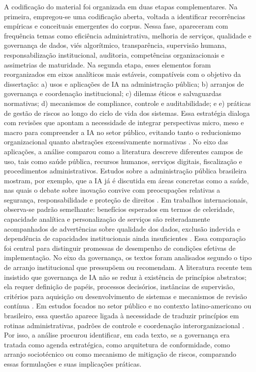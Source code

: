 \documentclass[12pt,a4paper]{article}
\begin{document}
A codificação do material foi organizada em duas etapas complementares. Na primeira, empregou-se uma codificação aberta, voltada a identificar recorrências empíricas e conceituais emergentes do corpus. Nessa fase, apareceram com frequência temas como eficiência administrativa, melhoria de serviços, qualidade e governança de dados, viés algorítmico, transparência, supervisão humana, responsabilização institucional, auditoria, competências organizacionais e assimetrias de maturidade. Na segunda etapa, esses elementos foram reorganizados em eixos analíticos mais estáveis, compatíveis com o objetivo da dissertação: a) usos e aplicações de IA na administração pública; b) arranjos de governança e coordenação institucional; c) dilemas éticos e salvaguardas normativas; d) mecanismos de compliance, controle e auditabilidade; e e) práticas de gestão de riscos ao longo do ciclo de vida dos sistemas. Essa estratégia dialoga com revisões que apontam a necessidade de integrar perspectivas micro, meso e macro para compreender a IA no setor público, evitando tanto o reducionismo organizacional quanto abstrações excessivamente normativas \autocite{criado2024artificial}.
No eixo das aplicações, a análise comparou como a literatura descreve diferentes campos de uso, tais como saúde pública, recursos humanos, serviços digitais, fiscalização e procedimentos administrativos. Estudos sobre a administração pública brasileira mostram, por exemplo, que a IA já é discutida em áreas concretas como a saúde, nas quais o debate sobre inovação convive com preocupações relativas a segurança, responsabilidade e proteção de direitos \autocite{lemes2020o}. Em trabalhos internacionais, observa-se padrão semelhante: benefícios esperados em termos de celeridade, capacidade analítica e personalização de serviços são reiteradamente acompanhados de advertências sobre qualidade dos dados, exclusão indevida e dependência de capacidades institucionais ainda insuficientes \autocite{alhosani2024opportunities} \autocite{yiitcanlar2022artificial}. Essa comparação foi central para distinguir promessas de desempenho de condições efetivas de implementação.
No eixo da governança, os textos foram analisados segundo o tipo de arranjo institucional que pressupõem ou recomendam. A literatura recente tem insistido que governança de IA não se reduz à existência de princípios abstratos; ela requer definição de papéis, processos decisórios, instâncias de supervisão, critérios para aquisição ou desenvolvimento de sistemas e mecanismos de revisão contínua \autocite{batool2025ai} \autocite{sigfrids2022how}. Em estudos focados no setor público e no contexto latino-americano ou brasileiro, essa questão aparece ligada à necessidade de traduzir princípios em rotinas administrativas, padrões de controle e coordenação interorganizacional \autocite{criado2024inteligencia} \autocite{goulart2025processos} \autocite{serra2024a}. Por isso, a análise procurou identificar, em cada texto, se a governança era tratada como agenda estratégica, como arquitetura de conformidade, como arranjo sociotécnico ou como mecanismo de mitigação de riscos, comparando essas formulações e suas implicações práticas.
\end{document}
